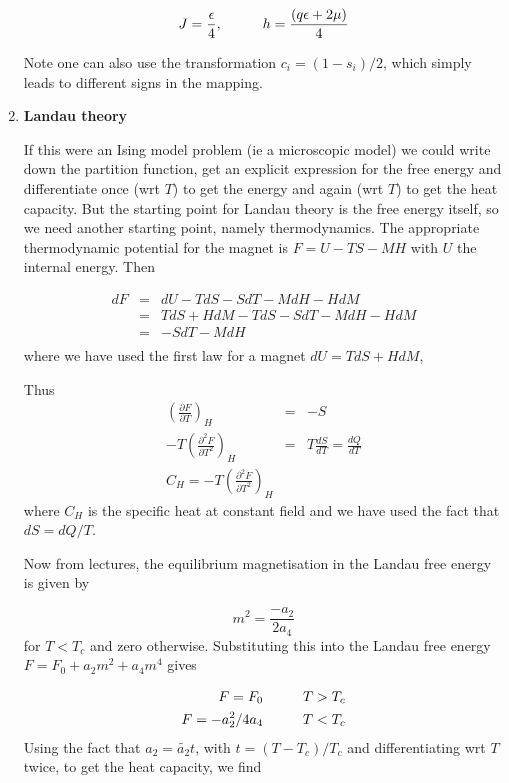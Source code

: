 \documentclass[a4paper,12pt,twoside]{article}
\begin{document}
\begin{enumerate}
\[
J=\frac{\epsilon}{4}, \hspace*{1cm} h=\frac{(q\epsilon+2\mu)}{4}
\]

Note one can also use the transformation $c_i=(1-s_i)/2$, which simply leads to different signs in the mapping.

\item {\bf Landau theory}

If this were an Ising model problem (ie a microscopic model) we could
write down the partition function, get an explicit expression for the
free energy and differentiate once (wrt $T$) to get the energy and again
(wrt $T$) to get the heat capacity. But the
starting point for Landau theory is the free energy itself, so we need
another starting point, namely thermodynamics. The appropriate
thermodynamic potential for the magnet is $F=U-TS-MH$ with $U$ the internal
energy. Then 

\begin{eqnarray*}
dF &=& dU-TdS-SdT-MdH-HdM\\
\: &=& TdS+HdM-TdS-SdT-MdH-HdM\\
\: &=& -SdT-MdH\\
\end{eqnarray*}
where we have used the first law for a magnet $dU=TdS+HdM$, 

Thus
\begin{eqnarray*}
\left(\frac{\partial F}{\partial T}\right)_H&=&-S\\
-T\left(\frac{\partial^2 F}{\partial T^2}\right)_H&=&T\frac{dS}{dT}=\frac{dQ}{dT}\\
C_H=-T\left(\frac{\partial^2 F}{\partial T^2}\right)_H
\end{eqnarray*}
where $C_H$ is the specific heat at constant field and we have used the
fact that $dS=dQ/T$.

Now from lectures, the equilibrium magnetisation in the Landau free
energy is given by 

\[
m^2=\frac{-a_2}{2a_4}
\]
for $T<T_c$ and zero otherwise. Substituting this into the Landau free energy
$F=F_0+a_2m^2+a_4m^4$ gives

\begin{eqnarray*}
F = F_0 \hspace*{1cm} T>T_c\nonumber\\
F = -a_2^2/4a_4 \hspace*{1cm} T < T_c
\end{eqnarray*}
Using the fact that $a_2=\tilde{a_2} t$, with $t=(T-T_c)/T_c$ and differentiating wrt $T$
twice, to get the heat capacity, we find 


\end{enumerate}
\end{document}
